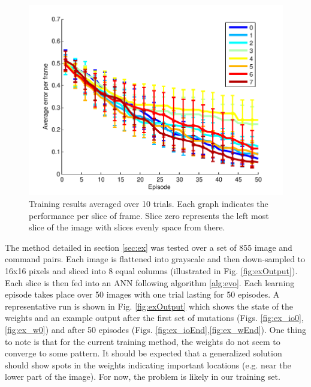 \documentclass{article}
\begin{document}
		\begin{figure}[tight]
			\begin{center}
				\includegraphics[width=1.1\columnwidth]{data.pdf}
			\end{center}
			\vspace{-6pt}
			\caption{Training results averaged over 10 trials.  Each graph indicates the performance per slice of frame.  Slice zero represents the left most slice of the image with slices evenly space from there.}
			\vspace{-6pt}
			\label{fig:graph}
		\end{figure}


		The method detailed in section \ref{sec:ex} was tested over a set of 855 image and command pairs.  Each image is flattened into grayscale and then down-sampled to 16x16 pixels and sliced into 8 equal columns (illustrated in Fig. \ref{fig:exOutput}).  Each slice is then fed into an ANN following algorithm \ref{alg:evo}.  Each learning episode takes place over 50 images with one trial lasting for 50 episodes.  A representative run is shown in Fig. \ref{fig:exOutput} which shows the state of the weights and an example output after the first set of mutations (Figs. \ref{fig:ex_io0},\ref{fig:ex_w0}) and after 50 episodes (Figs. \ref{fig:ex_ioEnd},\ref{fig:ex_wEnd}).  One thing to note is that for the current training method, the weights do not seem to converge to some pattern.  It should be expected that a generalized solution should show spots in the weights indicating important locations (e.g. near the lower part of the image).  For now, the problem is likely in our training set.
\end{document}
